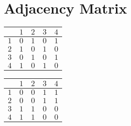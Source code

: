 \documentclass[a4paper]{tufte-handout}
\begin{document}
\section{Adjacency Matrix}


    \begin{minipage}{0.3\columnwidth}
    \centering
    \begin{tabular}{ c|cccc } 
          & $1$ & $2$ & $3$ & $4$ \\
        \hline
        $1$ & $0$ & $1$ & $0$ & $1$ \\ 
        $2$ & $1$ & $0$ & $1$ & $0$ \\ 
        $3$ & $0$ & $1$ & $0$ & $1$ \\ 
        $4$ & $1$ & $0$ & $1$ & $0$ \\ 
    \end{tabular}
    \end{minipage}
        \begin{minipage}{0.3\columnwidth}
    \centering
    \begin{tabular}{ c|cccc } 
           & $1$ & $2$ & $3$ & $4$ \\
         \hline
         $1$ & $0$ & $0$ & $1$ & $1$ \\ 
         $2$ & $0$ & $0$ & $1$ & $1$ \\ 
         $3$ & $1$ & $1$ & $0$ & $0$ \\ 
         $4$ & $1$ & $1$ & $0$ & $0$ \\ 
    \end{tabular}
    \end{minipage}
    \begin{marginfigure}
    \begin{adjustbox}{max width={\columnwidth}, center}
    \end{adjustbox}
    \end{marginfigure}
\end{document}
